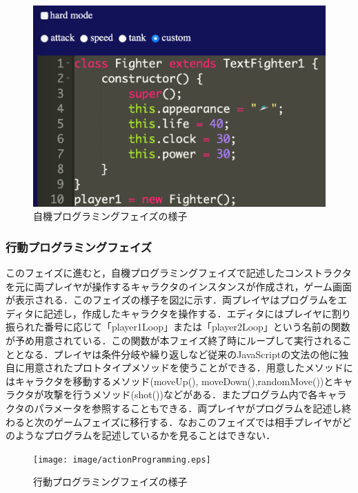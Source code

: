 \begin{figure}[!ht]
  \begin{center}
    \includegraphics[width=1.0\linewidth]{image/characterProgramming.eps}
  \end{center}
    \vspace{-8mm} 
  \caption{自機プログラミングフェイズの様子}
  \label{characterProgramming}
\end{figure}

\subsubsection{行動プログラミングフェイズ}
このフェイズに進むと，自機プログラミングフェイズで記述したコンストラクタを元に両プレイヤが操作するキャラクタのインスタンスが作成され，ゲーム画面が表示される．このフェイズの様子を図\ref{actionProgramming}に示す．両プレイヤはプログラムをエディタに記述し，作成したキャラクタを操作する．エディタにはプレイヤに割り振られた番号に応じて「player1Loop」または「player2Loop」という名前の関数が予め用意されている．この関数が本フェイズ終了時にループして実行されることとなる．プレイヤは条件分岐や繰り返しなど従来のJavaScriptの文法の他に独自に用意されたプロトタイプメソッドを使うことができる．用意したメソッドにはキャラクタを移動するメソッド(moveUp(), moveDown(),randomMove())とキャラクタが攻撃を行うメソッド(shot())などがある．またプログラム内で各キャラクタのパラメータを参照することもできる．両プレイヤがプログラムを記述し終わると次のゲームフェイズに移行する．なおこのフェイズでは相手プレイヤがどのようなプログラムを記述しているかを見ることはできない．

\begin{figure}[!ht]
  \begin{center}
    \texttt{[image: image/actionProgramming.eps]}
  \end{center}
    \vspace{-8mm} 
  \caption{行動プログラミングフェイズの様子}
  \label{actionProgramming}
\end{figure}

